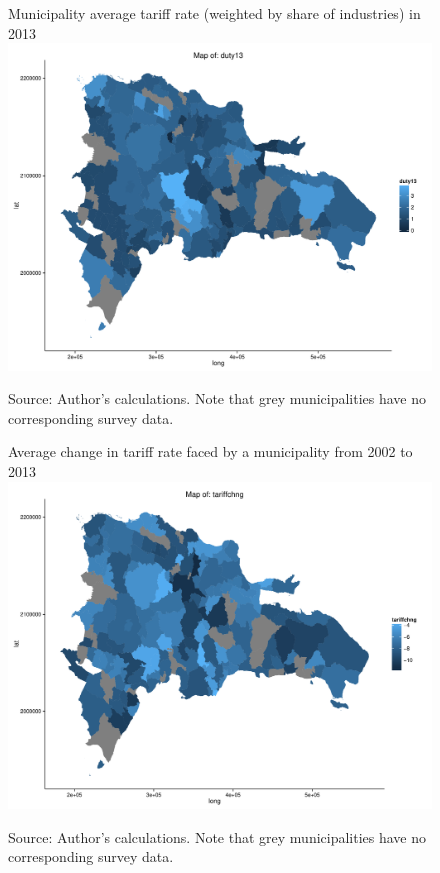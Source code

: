 \begin{landscape}
\begin{figure}[H]
\centering
Municipality average tariff rate (weighted by share of industries) in 2013
\includegraphics[height=\vsize,keepaspectratio=true]{../Maps/drduty13.pdf}
\caption{\label{fig:Map2}}
Source: Author's calculations. Note that grey municipalities have no corresponding survey data.
\end{figure}

\begin{figure}[H]
\centering
Average change in tariff rate faced by a municipality from 2002 to 2013
\includegraphics[height=\vsize,keepaspectratio=true]{../Maps/drtariffchng.pdf}
\caption{\label{fig:Map3}}
Source: Author's calculations. Note that grey municipalities have no corresponding survey data.
\end{figure}
\end{landscape}